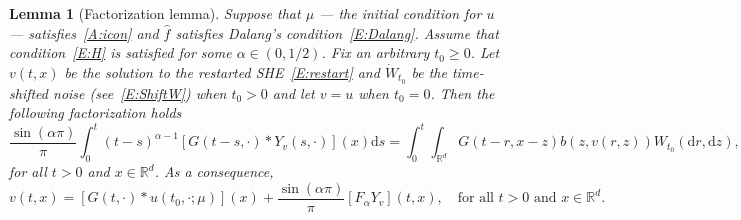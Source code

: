\documentclass[a4paper,11pt]{article}%
\theoremstyle{plain}
\newtheorem{lemma}[theorem]{Lemma}
\theoremstyle{definition}
\numberwithin{equation}{section}
\newcommand{\R}{\mathbb{R}}
\newcommand{\ud}{\ensuremath{\mathrm{d}}}
\begin{document}
\begin{lemma}[Factorization lemma]\label{L:Factorize}
  Suppose that $\mu$ --- the initial condition for $u$ --- satisfies~\eqref{A:icon} and
  $\widehat{f}$ satisfies Dalang's condition~\eqref{E:Dalang}. Assume that condition~\eqref{E:H} is
  satisfied for some $\alpha\in (0,1/2)$. Fix an arbitrary $ t_0\ge 0$. Let $v(t,x)$ be the solution
  to the restarted SHE~\eqref{E:restart} and $\dot{W}_{t_0}$ be the time-shifted noise
  (see~\eqref{E:ShiftW}) when $t_0>0$ and let $v = u$ when $ t_0 = 0$. Then the following
  factorization holds
  \begin{equation*}
    \dfrac{\sin(\alpha \pi)}{\pi}
    \int_0^t (t-s)^{\alpha-1}\left[G(t-s,\cdot)*Y_v(s,\cdot)\right](x) \ud s
    = \int_0^t \int_{\R^d} G(t-r,x-z)b(z,v(r,z)) W_{t_0}(\ud r,\ud z),
  \end{equation*}
  for all $t>0$ and $x\in\R^d$. As a consequence,
  \begin{equation}\label{E:1fac}
    v(t,x) = \left[G(t, \cdot) * u(t_0,\cdot; \mu)\right](x) +\dfrac{\sin(\alpha \pi)}{\pi} \left[F_\alpha Y_v\right](t,x),
    \quad \text{for all $t>0$ and $x\in\R^d$}.
  \end{equation}
\end{lemma}
\end{document}
